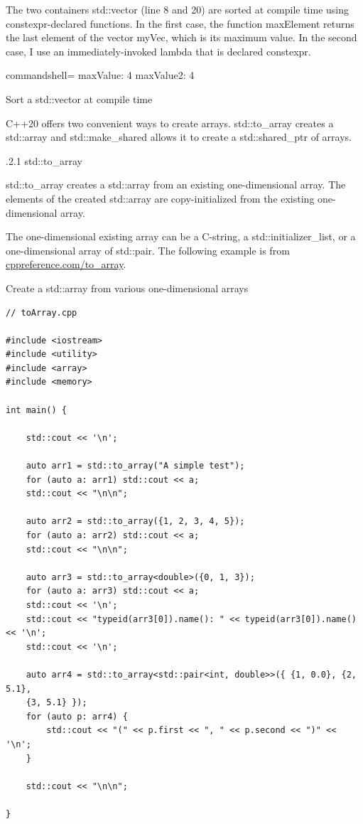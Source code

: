The two containers std::vector (line 8 and 20) are sorted at compile time using constexpr-declared functions. In the first case, the function maxElement returns the last element of the vector myVec, which is its maximum value. In the second case, I use an immediately-invoked lambda that is declared constexpr.

\begin{tcblisting}{commandshell={}}
maxValue: 4
maxValue2: 4
\end{tcblisting}

\begin{center}
Sort a std::vector at compile time
\end{center}


C++20 offers two convenient ways to create arrays. std::to\_array creates a std::array and std::make\_shared allows it to create a std::shared\_ptr of arrays.

.2.1\hspace{0.2cm} std::to\_array

std::to\_array creates a std::array from an existing one-dimensional array. The elements of the created std::array are copy-initialized from the existing one-dimensional array.

The one-dimensional existing array can be a C-string, a std::initializer\_list, or a one-dimensional array of std::pair. The following example is from \href{https://en.cppreference.com/w/cpp/container/array/to_array}{cppreference.com/to\_array}.

\noindent
Create a std::array from various one-dimensional arrays
\begin{lstlisting}[style=styleCXX]
// toArray.cpp

#include <iostream>
#include <utility>
#include <array>
#include <memory>

int main() {

	std::cout << '\n';
	
	auto arr1 = std::to_array("A simple test");
	for (auto a: arr1) std::cout << a;
	std::cout << "\n\n";
	
	auto arr2 = std::to_array({1, 2, 3, 4, 5});
	for (auto a: arr2) std::cout << a;
	std::cout << "\n\n";
	
	auto arr3 = std::to_array<double>({0, 1, 3});
	for (auto a: arr3) std::cout << a;
	std::cout << '\n';
	std::cout << "typeid(arr3[0]).name(): " << typeid(arr3[0]).name() << '\n';
	std::cout << '\n';
	
	auto arr4 = std::to_array<std::pair<int, double>>({ {1, 0.0}, {2, 5.1},
	{3, 5.1} });
	for (auto p: arr4) {
		std::cout << "(" << p.first << ", " << p.second << ")" << '\n';
	}
	
	std::cout << "\n\n";

}
\end{lstlisting}

